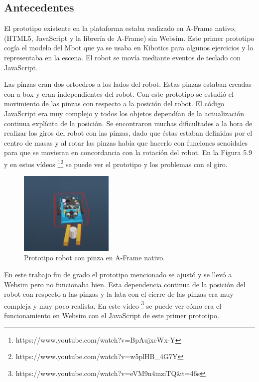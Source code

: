 \subsection{Antecedentes}
El prototipo existente en la plataforma estaba realizado en A-Frame nativo, (HTML5, JavaScript y la librería de A-Frame) sin Websim. Este primer prototipo cogía el modelo del Mbot que ya se usaba en Kibotics para algunos ejercicios y lo representaba en la escena. El robot se movía mediante eventos de teclado con JavaScript. 

Las pinzas eran dos ortoedros a los lados del robot. Estas pinzas estaban creadas con a-box y eran  independientes del robot. Con este prototipo se estudió el movimiento de las pinzas con respecto a la posición del robot. El código JavaScript era muy complejo y todos los objetos dependían de la actualización continua explícita de la posición. 
Se encontraron muchas dificultades a la hora de realizar los giros del robot con las pinzas, dado que éstas estaban definidas por el centro de masas y al rotar las pinzas había que hacerlo con funciones senoidales para que se movieran en concordancia con la rotación del robot. En la Figura 5.9 y en estos vídeos \footnote{https://www.youtube.com/watch?v=BpAujxcWx-Y}\footnote{https://www.youtube.com/watch?v=w5plHB\_4G7Y} se puede ver el prototipo y los problemas con el giro.

 \begin{figure}[H]
  \centering
 \includegraphics[width=0.40\textwidth]{chapters/images/prototipo.png}
  \caption{Prototipo robot con pinza en A-Frame nativo.}
\end{figure}

En este trabajo fin de grado el prototipo mencionado se ajustó y se llevó a Websim pero no funcionaba bien. Esta dependencia continua de la posición del robot con respecto a las pinzas y la lata con el cierre de las pinzas era muy compleja y muy poco realista. En este vídeo  \footnote{https://www.youtube.com/watch?v=eVM9n4mziTQ\&t=46s} se puede ver cómo era el funcionamiento en Websim con el JavaScript de este primer prototipo.  


